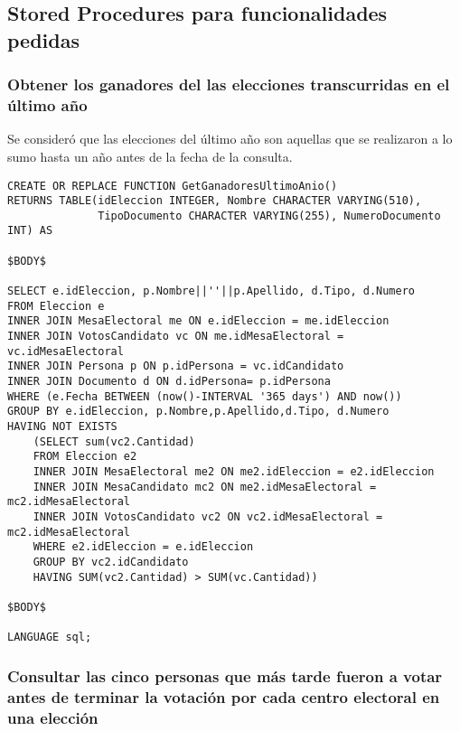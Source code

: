 \subsection{Stored Procedures para funcionalidades pedidas}

\subsubsection{Obtener los ganadores del las elecciones transcurridas en el último año}

\indent Se consideró que las elecciones del último año son aquellas que se realizaron a lo sumo hasta un año antes de la fecha de la consulta.\\

\begin{verbatim}
CREATE OR REPLACE FUNCTION GetGanadoresUltimoAnio()
RETURNS TABLE(idEleccion INTEGER, Nombre CHARACTER VARYING(510),
              TipoDocumento CHARACTER VARYING(255), NumeroDocumento INT) AS

$BODY$

SELECT e.idEleccion, p.Nombre||''||p.Apellido, d.Tipo, d.Numero
FROM Eleccion e
INNER JOIN MesaElectoral me ON e.idEleccion = me.idEleccion
INNER JOIN VotosCandidato vc ON me.idMesaElectoral = vc.idMesaElectoral
INNER JOIN Persona p ON p.idPersona = vc.idCandidato
INNER JOIN Documento d ON d.idPersona= p.idPersona
WHERE (e.Fecha BETWEEN (now()-INTERVAL '365 days') AND now())
GROUP BY e.idEleccion, p.Nombre,p.Apellido,d.Tipo, d.Numero
HAVING NOT EXISTS
    (SELECT sum(vc2.Cantidad)
    FROM Eleccion e2
    INNER JOIN MesaElectoral me2 ON me2.idEleccion = e2.idEleccion
    INNER JOIN MesaCandidato mc2 ON me2.idMesaElectoral = mc2.idMesaElectoral
    INNER JOIN VotosCandidato vc2 ON vc2.idMesaElectoral = mc2.idMesaElectoral
    WHERE e2.idEleccion = e.idEleccion
    GROUP BY vc2.idCandidato
    HAVING SUM(vc2.Cantidad) > SUM(vc.Cantidad))

$BODY$

LANGUAGE sql;

\end{verbatim}

\subsubsection{Consultar las cinco personas que más tarde fueron a votar antes de terminar la votación por cada centro electoral en una elección}


